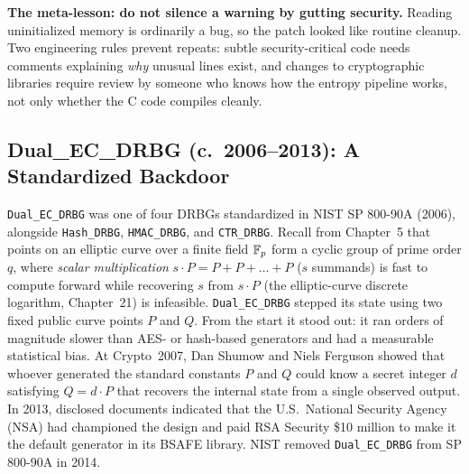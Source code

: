 \begin{trapbox}
\textbf{The meta-lesson: do not silence a warning by gutting security.} Reading uninitialized memory is ordinarily a bug, so the patch looked like routine cleanup. Two engineering rules prevent repeats: subtle security-critical code needs comments explaining \emph{why} unusual lines exist, and changes to cryptographic libraries require review by someone who knows how the entropy pipeline works, not only whether the C code compiles cleanly.
\end{trapbox}

\subsection{Dual\_EC\_DRBG (c.\ 2006--2013): A Standardized Backdoor}
\label{ch17:dualec}

\begin{historybox}
\texttt{Dual\_EC\_DRBG} was one of four DRBGs standardized in NIST SP 800-90A (2006), alongside \texttt{Hash\_DRBG}, \texttt{HMAC\_DRBG}, and \texttt{CTR\_DRBG}. Recall from Chapter~5 that points on an elliptic curve over a finite field $\mathbb{F}_p$ form a cyclic group of prime order $q$, where \emph{scalar multiplication} $s \cdot P = P + P + \dots + P$ ($s$ summands) is fast to compute forward while recovering $s$ from $s \cdot P$ (the elliptic-curve discrete logarithm, Chapter~21) is infeasible. \texttt{Dual\_EC\_DRBG} stepped its state using two fixed public curve points $P$ and $Q$. From the start it stood out: it ran orders of magnitude slower than AES- or hash-based generators and had a measurable statistical bias. At Crypto~2007, Dan Shumow and Niels Ferguson showed that whoever generated the standard constants $P$ and $Q$ could know a secret integer $d$ satisfying $Q = d \cdot P$ that recovers the internal state from a single observed output. In 2013, disclosed documents indicated that the U.S.\ National Security Agency (NSA) had championed the design and paid RSA Security \$10 million to make it the default generator in its BSAFE library. NIST removed \texttt{Dual\_EC\_DRBG} from SP 800-90A in 2014.
\end{historybox}

